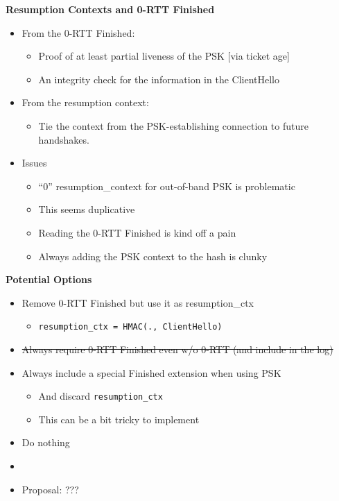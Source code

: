 \documentclass[helvetica]{seminar}
\newcommand{\heading}[1]{%
  \begin{center} 
    \large\bf 
    #1 
  \end{center} 
  \vspace{.4 in}}
\begin{document}
\begin{slide}
\heading{Resumption Contexts and 0-RTT Finished}

\begin{itemize}
\item From the 0-RTT Finished:
\begin{itemize}
\item Proof of at least partial liveness of the PSK [via ticket age]
\item An integrity check for the information in the ClientHello
\end{itemize}
\item From the resumption context:
\begin{itemize}
\item Tie the context from the PSK-establishing connection to
  future handshakes.
\end{itemize}

\item Issues
  \begin{itemize}
  \item ``0'' resumption\_context for out-of-band PSK is problematic
  \item This seems duplicative
  \item Reading the 0-RTT Finished is kind off a pain
  \item Always adding the PSK context to the hash is clunky
  \end{itemize}
\end{itemize}

\end{slide}


\begin{slide}
\heading{Potential Options}

\begin{itemize}
\item Remove 0-RTT Finished but use it as resumption\_ctx
  \begin{itemize}
  \item \verb^resumption_ctx = HMAC(., ClientHello)^
  \end{itemize}
\item \sout{Always require 0-RTT Finished even w/o 0-RTT (and include in the log)}
\item Always include a special Finished extension when using PSK
  \begin{itemize}
  \item And discard \verb^resumption_ctx^
  \item This can be a bit tricky to implement
  \end{itemize}
\item Do nothing
\item[]
\item Proposal: ???
\end{itemize}
\end{slide}
\end{document}
